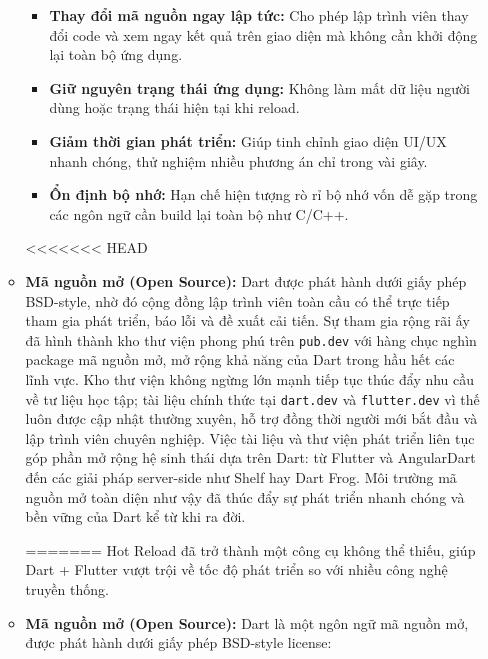 \documentclass[../DoAn.tex]{subfiles}
\numberwithin{figure}{chapter}
\begin{document}
\begin{itemize}
\begin{itemize}
\begin{itemize}
    \item \textbf{Thay đổi mã nguồn ngay lập tức:} Cho phép lập trình viên thay đổi code và xem ngay kết quả trên giao diện mà không cần khởi động lại toàn bộ ứng dụng.
    \item \textbf{Giữ nguyên trạng thái ứng dụng:} Không làm mất dữ liệu người dùng hoặc trạng thái hiện tại khi reload.
    \item \textbf{Giảm thời gian phát triển:} Giúp tinh chỉnh giao diện UI/UX nhanh chóng, thử nghiệm nhiều phương án chỉ trong vài giây.
    \item \textbf{Ổn định bộ nhớ:} Hạn chế hiện tượng rò rỉ bộ nhớ vốn dễ gặp trong các ngôn ngữ cần build lại toàn bộ như C/C++.
\end{itemize}

<<<<<<< HEAD

\item \textbf{Mã nguồn mở (Open Source):} Dart được phát hành dưới giấy phép BSD-style, nhờ đó cộng đồng lập trình viên toàn cầu có thể trực tiếp tham gia phát triển, báo lỗi và đề xuất cải tiến. Sự tham gia rộng rãi ấy đã hình thành kho thư viện phong phú trên \texttt{pub.dev} với hàng chục nghìn package mã nguồn mở, mở rộng khả năng của Dart trong hầu hết các lĩnh vực. Kho thư viện không ngừng lớn mạnh tiếp tục thúc đẩy nhu cầu về tư liệu học tập; tài liệu chính thức tại \texttt{dart.dev} và \texttt{flutter.dev} vì thế luôn được cập nhật thường xuyên, hỗ trợ đồng thời người mới bắt đầu và lập trình viên chuyên nghiệp. Việc tài liệu và thư viện phát triển liên tục góp phần mở rộng hệ sinh thái dựa trên Dart: từ Flutter và AngularDart đến các giải pháp server-side như Shelf hay Dart Frog. Môi trường mã nguồn mở toàn diện như vậy đã thúc đẩy sự phát triển nhanh chóng và bền vững của Dart kể từ khi ra đời.








=======
Hot Reload đã trở thành một công cụ không thể thiếu, giúp Dart + Flutter vượt trội về tốc độ phát triển so với nhiều công nghệ truyền thống.

\item \textbf{Mã nguồn mở (Open Source):} 
Dart là một ngôn ngữ mã nguồn mở, được phát hành dưới giấy phép BSD-style license:


\end{itemize}
\end{itemize}
\end{document}
